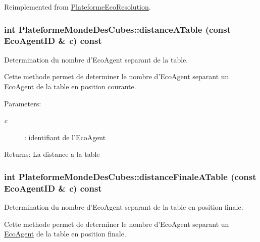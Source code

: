 Reimplemented from \hyperlink{classPlateformeEcoResolution_6fdb4c8ecc62252da4326d9763d4f28d}{PlateformeEcoResolution}.\hypertarget{classPlateformeMondeDesCubes_4a5d7a96766cf9a3e1acae5b3d8263fa}{
\subsubsection[{distanceATable}]{\setlength{\rightskip}{0pt plus 5cm}int PlateformeMondeDesCubes::distanceATable (const {\bf EcoAgentID} \& {\em c}) const}}
\label{classPlateformeMondeDesCubes_4a5d7a96766cf9a3e1acae5b3d8263fa}


Determination du nombre d'EcoAgent separant de la table. 

Cette methode permet de determiner le nombre d'EcoAgent separant un \hyperlink{classEcoAgent}{EcoAgent} de la table en position courante.

\begin{Desc}
\item[Parameters:]
\begin{description}
\item[{\em c}]: identifiant de l'EcoAgent \end{description}
\end{Desc}
\begin{Desc}
\item[Returns:]La distance a la table \end{Desc}
\hypertarget{classPlateformeMondeDesCubes_7f694f86cf4a9502cf6bba2d6eb5a371}{
\subsubsection[{distanceFinaleATable}]{\setlength{\rightskip}{0pt plus 5cm}int PlateformeMondeDesCubes::distanceFinaleATable (const {\bf EcoAgentID} \& {\em c}) const}}
\label{classPlateformeMondeDesCubes_7f694f86cf4a9502cf6bba2d6eb5a371}


Determination du nombre d'EcoAgent separant de la table en position finale. 

Cette methode permet de determiner le nombre d'EcoAgent separant un \hyperlink{classEcoAgent}{EcoAgent} de la table en position finale.

